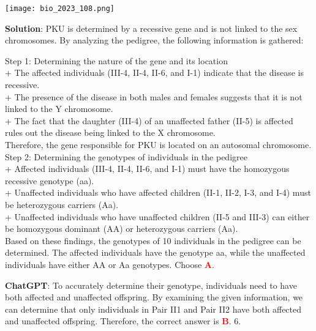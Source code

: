 \documentclass{article}
\begin{document}
{\begin{mdframed}[linewidth=1pt,linecolor=red]
		\texttt{[image: bio\_2023\_108.png]}
		
		\begin{oneparchoices}
		\end{oneparchoices}
		
		\textbf{Solution}: PKU is determined by a recessive gene and is not linked to the sex chromosomes. By analyzing the pedigree, the following information is gathered:
		
		Step 1: Determining the nature of the gene and its location \\
		+ The affected individuals (III-4, II-4, II-6, and I-1) indicate that the disease is recessive.\\
		+ The presence of the disease in both males and females suggests that it is not linked to the Y chromosome.\\
		+ The fact that the daughter (III-4) of an unaffected father (II-5) is affected rules out the disease being linked to the X chromosome.\\
		Therefore, the gene responsible for PKU is located on an autosomal chromosome.\\
		Step 2: Determining the genotypes of individuals in the pedigree\\
		+ Affected individuals (III-4, II-4, II-6, and I-1) must have the homozygous recessive genotype (aa).\\
		+ Unaffected individuals who have affected children (II-1, II-2, I-3, and I-4) must be heterozygous carriers (Aa).\\
		+ Unaffected individuals who have unaffected children (II-5 and III-3) can either be homozygous dominant (AA) or heterozygous carriers (Aa).\\
		Based on these findings, the genotypes of 10 individuals in the pedigree can be determined. The affected individuals have the genotype aa, while the unaffected individuals have either AA or Aa genotypes.
		Choose \textcolor{red}{\textbf{A}}. 
		
		\textbf{ChatGPT}: To accurately determine their genotype, individuals need to have both affected and unaffected offspring. By examining the given information, we can determine that only individuals in Pair II1 and Pair II2 have both affected and unaffected offspring. Therefore, the correct answer is \textcolor{red}{\textbf{B}}. 6.
		

\end{mdframed}}
\end{document}
